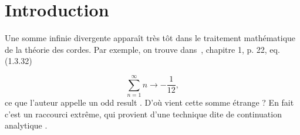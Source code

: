 \section{Introduction}

Une somme infinie divergente apparaît très tôt dans le traitement mathématique de la théorie des cordes. Par exemple, on trouve dans~\cite{stringtheory98}, chapitre 1, p. 22, eq. (1.3.32)

\begin{equation}
\sum_{n=1}^{\infty} n \rightarrow -\frac{1}{12},\label{eq.zeta-1}
\end{equation}
ce que l'auteur appelle un \og odd result \fg. D'où vient cette somme étrange ? En fait c'est un raccourci extrême, qui provient d'une technique dite de \og continuation analytique \fg.